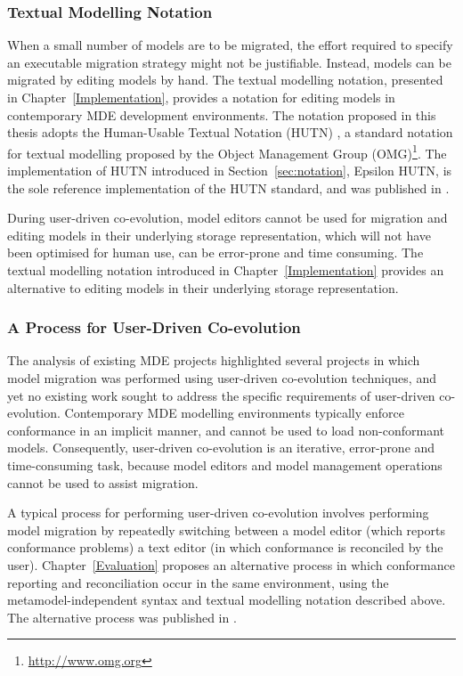 \subsubsection{Textual Modelling Notation}
When a small number of models are to be migrated, the effort required to specify an executable migration strategy might not be justifiable. Instead, models can be migrated by editing models by hand. The textual modelling notation, presented in Chapter~\ref{Implementation}, provides a notation for editing models in contemporary MDE development environments. The notation proposed in this thesis adopts the Human-Usable Textual Notation (HUTN) \cite{hutn}, a standard notation for textual modelling proposed by the Object Management Group (OMG)\footnote{\url{http://www.omg.org}}. The implementation of HUTN introduced in Section~\ref{sec:notation}, Epsilon HUTN, is the sole reference implementation of the HUTN standard, and was published in \cite{rose08hutn}.

During user-driven co-evolution, model editors cannot be used for migration and editing models in their underlying storage representation, which will not have been optimised for human use, can be error-prone and time consuming. The textual modelling notation introduced in Chapter~\ref{Implementation} provides an alternative to editing models in their underlying storage representation.


\subsubsection{A Process for User-Driven Co-evolution}
The analysis of existing MDE projects highlighted several projects in which model migration was performed using user-driven co-evolution techniques, and yet no existing work sought to address the specific requirements of user-driven co-evolution. Contemporary MDE modelling environments typically enforce conformance in an implicit manner, and cannot be used to load non-conformant models. Consequently, user-driven co-evolution is an iterative, error-prone and time-consuming task, because model editors and model management operations cannot be used to assist migration.

A typical process for performing user-driven co-evolution involves performing model migration by repeatedly switching between a model editor (which reports conformance problems) a text editor (in which conformance is reconciled by the user). Chapter~\ref{Evaluation} proposes an alternative process in which conformance reporting and reconciliation occur in the same environment, using the metamodel-independent syntax and textual modelling notation described above. The alternative process was published in \cite{rose09enhanced}.


